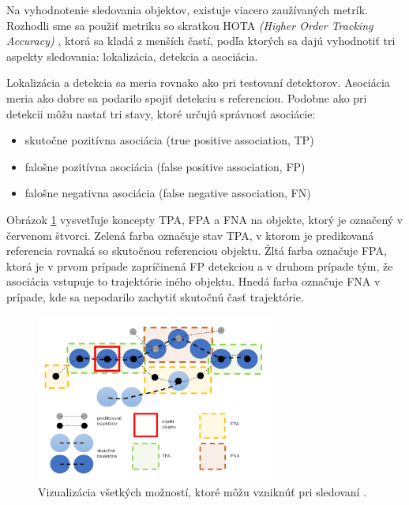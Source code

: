 Na vyhodnotenie sledovania objektov, existuje viacero zaužívaných metrík. Rozhodli sme sa použiť metriku so skratkou HOTA \textit{(Higher Order Tracking Accuracy)} \cite{hota}, ktorá sa kladá z menších častí, podľa ktorých sa dajú vyhodnotiť tri aspekty sledovania: lokalizácia, detekcia a asociácia.

Lokalizácia a detekcia sa meria rovnako ako pri testovaní detektorov. Asociácia meria ako dobre sa podarilo spojiť detekciu s referenciou. Podobne ako pri detekcii môžu nastať tri stavy, ktoré určujú správnosť asociácie:

\begin{itemize}
  \item skutočne pozitívna asociácia (true positive association, TP)
  \item falošne pozitívna asociácia (false positive association, FP)
  \item falošne negativna asociácia (false negative association, FN)
\end{itemize}


Obrázok \ref{img:usecase} vysvetľuje koncepty TPA, FPA a FNA na objekte, ktorý je označený v červenom štvorci. Zelená farba označuje stav TPA, v ktorom je predikovaná referencia rovnaká so skutočnou referenciou objektu. Žltá farba označuje FPA, ktorá je v prvom prípade zapríčinená FP detekciou a v druhom prípade tým, že asociácia vstupuje to trajektórie iného objektu. Hnedá farba označuje FNA v prípade, kde sa nepodarilo zachytiť skutočnú časť trajektórie.

\begin{figure}[ht]
    \centering
    \includegraphics[width=0.7\textwidth]{images/05/usecase.png}
    \caption{Vizualizácia všetkých možností, ktoré môžu vzniknúť pri sledovaní \cite{hota}.}
    \label{img:usecase}
\end{figure}

